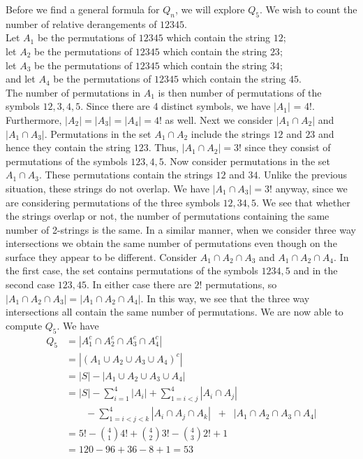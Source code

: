 \documentclass[handout]{ximera}
\begin{document}
Before we find a general formula for $Q_n$, we will explore $Q_5$. 
We wish to count the number of relative derangements of $12345$.\\
Let $A_1$ be the permutations of $12345$ which contain the string $12$;\\
let $A_2$ be the permutations of $12345$ which contain the string $23$;\\
let $A_3$ be the permutations of $12345$ which contain the string $34$;\\
and let $A_4$ be the permutations of $12345$ which contain the string $45$.\\
The number of permutations in $A_1$ is then number of permutations of the symbols $12, 3, 4, 5$.  
Since there are 4 distinct symbols, we have $|A_1|$ = 4!. Furthermore, $|A_2| = |A_3| = |A_4| = 4!$ as well.
Next we consider $|A_1 \cap A_2|$ and $|A_1 \cap A_3|$. Permutations in the set $A_1 \cap A_2$ include 
the strings $12$ and $23$ and hence they contain the string $123$. Thus, $|A_1 \cap A_2| = 3!$ since they 
consist of permutations of the symbols $123, 4, 5$. Now consider permutations in the set $A_1 \cap A_3$. 
These permutations contain the strings $12$ and $34$.  Unlike the previous situation, these strings do 
not overlap. We have $|A_1 \cap A_3| = 3!$ anyway, since we are considering permutations of the three 
symbols $12, 34, 5$. We see that whether the strings overlap or not, the number of permutations containing 
the same number of 2-strings is the same. In a similar manner, when we consider three way intersections
we obtain the same number of permutations even though on the surface they appear to be different.
Consider $A_1 \cap A_2 \cap A_3$ and $A_1 \cap A_2 \cap A_4$. In the first case, the set contains permutations of the symbols $1234, 5$ and in the second case $123, 45$.  In either case there are $2!$ permutations, so
$|A_1 \cap A_2 \cap A_3|=|A_1 \cap A_2 \cap A_4|$.  In this way, we see that the three way 
intersections all contain the same number of permutations. We are now able to compute $Q_5$. We have
\begin{align*}
Q_5 &= |A_1^c \cap A_2^c \cap A_3^c \cap A_4^c|\\
    &= |(A_1 \cup A_2 \cup A_3 \cup A_4)^c|\\
    &= |S| - |A_1 \cup A_2 \cup A_3 \cup A_4|\\
    &= |S| - \sum_{i =1}^4 |A_i| + \sum_{1=i<j}^4 |A_i \cap A_j|\\
    & \qquad  - \sum_{1 = i <j<k}^4 |A_i \cap A_j \cap A_k| \;\;+\;\; |A_1 \cap A_2 \cap A_3 \cap A_4|\\
    &= 5! - \binom{4}{1}4! + \binom{4}{2} 3! - \binom{4}{3}2! + 1\\
    &= 120 - 96 + 36 - 8 +1 = 53
 \end{align*}
    
\end{document}
